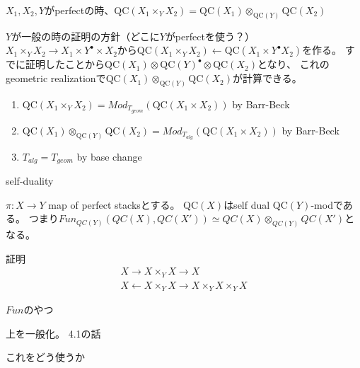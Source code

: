 \documentclass[dvipdfmx]{beamer}
\newcommand{\QC}{\mathrm{QC}}
\begin{document}
\begin{frame}
\begin{thm}[BFNのTheorem 4.7]
$X_1, X_2, Y$がperfectの時、$\QC(X_1 \times_Y X_2) = \QC(X_1) \otimes_{\QC(Y)}\QC(X_2)$
\end{thm}

$Y$が一般の時の証明の方針（どこに$Y$がperfectを使う？）
$X_1\times_YX_2 \to X_1\times Y^\bullet\times X_2$から$\QC(X_1\times_YX_2) \gets \QC(X_1\times Y^\bullet X_2)$を作る。
すでに証明したことから$\QC(X_1)\otimes \QC(Y)^\bullet\otimes \QC(X_2)$となり、
これのgeometric realizationで$\QC(X_1)\otimes_{\QC(Y)}\QC(X_2)$が計算できる。
\begin{enumerate}
\item $\QC(X_1\times_YX_2)=Mod_{T_{geom}}(\QC(X_1\times X_2))$ by Barr-Beck
\item $\QC(X_1)\otimes_{\QC(Y)}\QC(X_2)=Mod_{T_{alg}}(\QC(X_1\times X_2))$ by Barr-Beck
\item $T_{alg}=T_{geom}$ by base change
\end{enumerate}
\end{frame}

\begin{frame}{self-duality}
\begin{cor}
$\pi:X \to Y$ map of perfect stacksとする。
$\QC(X)$はself dual $\QC(Y)$-modである。
つまり$Fun_{QC(Y)}(QC(X),QC(X')) \simeq QC(X)\otimes_{QC(Y)}QC(X')$となる。
\end{cor}



証明
\begin{align*}
X \to X\times_YX \to X\\
X \gets X\times_YX \to X\times_YX\times_YX
\end{align*}

$Fun$のやつ
\end{frame}

\begin{frame}
上を一般化。
4.1の話

これをどう使うか
\end{frame}
\end{document}
